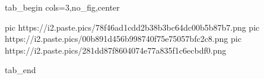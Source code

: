  
 
 
 
 


\ifcmt
  tab_begin cols=3,no_fig,center

     pic https://i2.paste.pics/78f46ad1cdd2b38b3bc64dc00b5b87b7.png
		 pic https://i2.paste.pics/00b891d456b998740f75e75057bfc2c8.png
		 pic https://i2.paste.pics/281dd87f8604074e77a835f1c6ecbdf0.png

  tab_end
\fi
